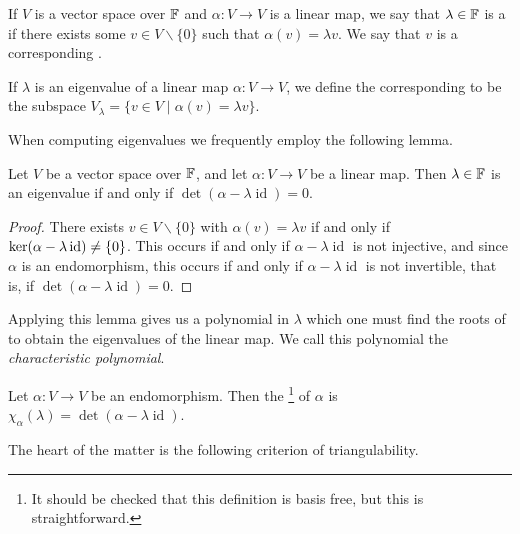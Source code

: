 \documentclass[a4paper]{scrartcl}
\begin{document}
\begin{definition}
    If $V $ is a vector space over $\mathbb{F}$ and $\alpha: V \rightarrow V$ is a linear map, we say that $\lambda \in \mathbb{F}$ is a  if there exists some $v \in V \backslash\{0\}$ such that $\alpha(v) = \lambda v$. We say that $v$ is a corresponding .
\end{definition}

\begin{definition}[Eigenspace]
    If $\lambda$ is an eigenvalue of a linear map $\alpha: V \rightarrow V$, we define the corresponding  to be the subspace $V_\lambda = \{v \in V \mid \alpha(v) = \lambda v\}$.
\end{definition}

When computing eigenvalues we frequently employ the following lemma.

\begin{lemma}
    Let $V$ be a vector space over $\mathbb{F}$, and
    let $\alpha: V \rightarrow V$ be a linear map. Then $\lambda \in \mathbb{F}$ is an eigenvalue if and only if $\det(\alpha - \lambda \operatorname{id}) = 0$.
\end{lemma}
\begin{proof}
    There exists $v \in V \backslash\{0\}$ with $\alpha(v) = \lambda v$ if and only if $\operatorname{ker} (\alpha - \lambda \operatorname{id}) \neq \{0\}$. This occurs if and only if $\alpha - \lambda \operatorname{id}$ is not injective, and since $\alpha$ is an endomorphism, this occurs if and only if $\alpha - \lambda \operatorname{id}$ is not invertible, that is, if $\det(\alpha - \lambda \operatorname{id}) = 0$.
\end{proof}

Applying this lemma gives us a polynomial in $\lambda$ which one must find the roots of to obtain the eigenvalues of the linear map. We call this polynomial the \emph{characteristic polynomial}.

\begin{definition}
    Let $\alpha: V \rightarrow V$ be an endomorphism. Then the \footnote{It should be checked that this definition is basis free, but this is straightforward.} of $\alpha$ is $\chi_{\alpha}(\lambda) = \det(\alpha - \lambda \operatorname{id})$.
\end{definition}

The heart of the matter is the following criterion of triangulability.
\end{document}
